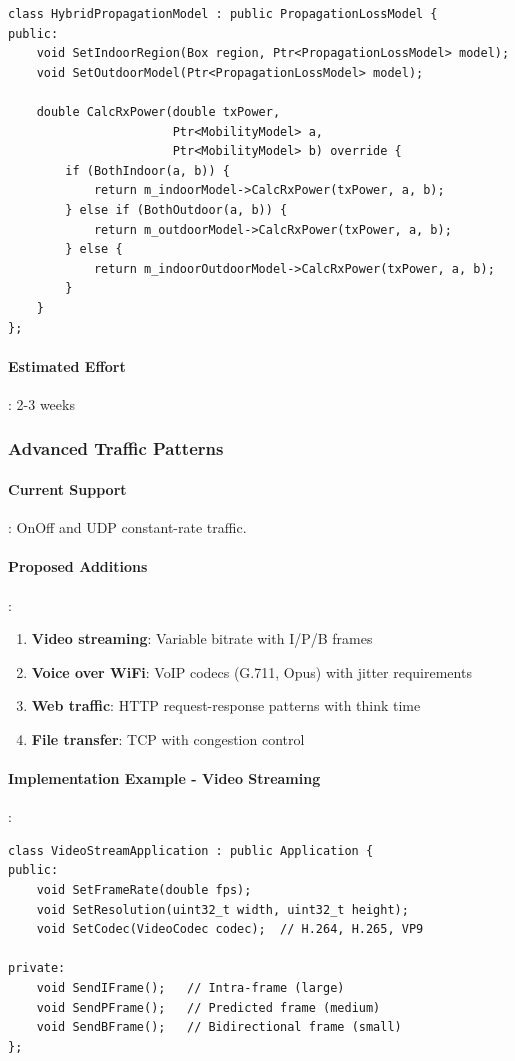 \begin{lstlisting}[style=cpp]
class HybridPropagationModel : public PropagationLossModel {
public:
    void SetIndoorRegion(Box region, Ptr<PropagationLossModel> model);
    void SetOutdoorModel(Ptr<PropagationLossModel> model);
    
    double CalcRxPower(double txPower, 
                       Ptr<MobilityModel> a, 
                       Ptr<MobilityModel> b) override {
        if (BothIndoor(a, b)) {
            return m_indoorModel->CalcRxPower(txPower, a, b);
        } else if (BothOutdoor(a, b)) {
            return m_outdoorModel->CalcRxPower(txPower, a, b);
        } else {
            return m_indoorOutdoorModel->CalcRxPower(txPower, a, b);
        }
    }
};
\end{lstlisting}

\paragraph{Estimated Effort}: 2-3 weeks

\subsubsection{Advanced Traffic Patterns}

\paragraph{Current Support}:
OnOff and UDP constant-rate traffic.

\paragraph{Proposed Additions}:
\begin{enumerate}
    \item \textbf{Video streaming}: Variable bitrate with I/P/B frames
    \item \textbf{Voice over WiFi}: VoIP codecs (G.711, Opus) with jitter requirements
    \item \textbf{Web traffic}: HTTP request-response patterns with think time
    \item \textbf{File transfer}: TCP with congestion control
\end{enumerate}

\paragraph{Implementation Example - Video Streaming}:
\begin{lstlisting}[style=cpp]
class VideoStreamApplication : public Application {
public:
    void SetFrameRate(double fps);
    void SetResolution(uint32_t width, uint32_t height);
    void SetCodec(VideoCodec codec);  // H.264, H.265, VP9
    
private:
    void SendIFrame();   // Intra-frame (large)
    void SendPFrame();   // Predicted frame (medium)
    void SendBFrame();   // Bidirectional frame (small)
};
\end{lstlisting}

